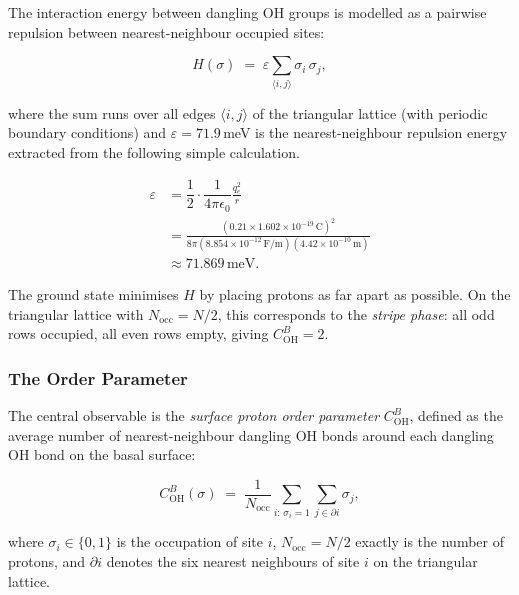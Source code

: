 \documentclass[12pt, a4paper]{article}
\theoremstyle{definition}
\newcommand{\COH}{C_\mathrm{OH}^B}
\newcommand{\Eeps}{\varepsilon}
\newcommand{\Nocc}{N_\mathrm{occ}}
\begin{document}
\hfill

The interaction energy between dangling OH groups is modelled as a
pairwise repulsion between nearest-neighbour occupied sites:

\begin{equation}
    H(\sigma) \;=\; \Eeps \sum_{\langle i,j \rangle} \sigma_i\,\sigma_j,
    \label{eq:hamiltonian}
\end{equation}

where the sum runs over all edges $\langle i,j \rangle$ of the
triangular lattice (with periodic boundary conditions) and
$\Eeps = 71.9$\,meV is the
nearest-neighbour repulsion energy extracted from the following simple calculation.

\begin{equation}
\begin{aligned}
    \varepsilon &= \dfrac{1}{2} \cdot \dfrac{1}{4\pi \epsilon_0} \frac{q_e^2}{r} \\
    &= \frac{(0.21 \times 1.602 \times 10^{-19}\,\mathrm{C})^2}{8\pi (8.854 \times 10^{-12}\,\mathrm{F/m})(4.42 \times 10^{-10}\,\mathrm{m})} \\
    &\approx 71.869\,\mathrm{meV}.
\end{aligned}
\end{equation}

\begin{physinsight}
    The ground state minimises $H$ by placing protons as far apart as
    possible.
    On the triangular lattice with $\Nocc = N/2$, this corresponds to
    the \emph{stripe phase}: all odd rows occupied, all even rows empty,
    giving $\COH = 2$.
\end{physinsight}



\subsubsection{The Order Parameter}

The central observable is the \emph{surface proton order parameter}
$\COH$, defined as the average number of nearest-neighbour dangling
OH bonds around each dangling OH bond on the basal surface:

\begin{equation}
    \COH(\sigma) \;=\; \frac{1}{\Nocc}\sum_{i:\,\sigma_i=1}
    \sum_{j \in \partial i} \sigma_j,
    \label{eq:COH_def}
\end{equation}

where $\sigma_i \in \{0,1\}$ is the occupation of site $i$,
$\Nocc = N/2$ exactly is the number of protons,
and $\partial i$ denotes the six nearest neighbours of site $i$
on the triangular lattice.
\end{document}
